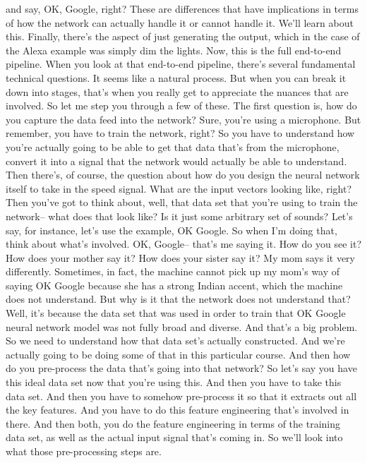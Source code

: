 and say, OK, Google, right?
These are differences that have implications in terms of how
the network can actually handle it or cannot handle it.
We'll learn about this.
Finally, there's the aspect of just generating
the output, which in the case of the Alexa example
was simply dim the lights.
Now, this is the full end-to-end pipeline.
When you look at that end-to-end pipeline,
there's several fundamental technical questions.
It seems like a natural process.
But when you can break it down into stages,
that's when you really get to appreciate the nuances that are involved.
So let me step you through a few of these.
The first question is, how do you capture the data feed into the network?
Sure, you're using a microphone.
But remember, you have to train the network, right?
So you have to understand how you're actually
going to be able to get that data that's from the microphone,
convert it into a signal that the network would actually
be able to understand.
Then there's, of course, the question about how
do you design the neural network itself to take in the speed signal.
What are the input vectors looking like, right?
Then you've got to think about, well, that data
set that you're using to train the network--
what does that look like?
Is it just some arbitrary set of sounds?
Let's say, for instance, let's use the example, OK Google.
So when I'm doing that, think about what's involved.
OK, Google-- that's me saying it.
How do you see it?
How does your mother say it?
How does your sister say it?
My mom says it very differently.
Sometimes, in fact, the machine cannot pick up my mom's way of saying OK
Google because she has a strong Indian accent,
which the machine does not understand.
But why is it that the network does not understand that?
Well, it's because the data set that was used
in order to train that OK Google neural network model was not
fully broad and diverse.
And that's a big problem.
So we need to understand how that data set's actually constructed.
And we're actually going to be doing some of that in this particular course.
And then how do you pre-process the data that's going into that network?
So let's say you have this ideal data set now that you're using this.
And then you have to take this data set.
And then you have to somehow pre-process it
so that it extracts out all the key features.
And you have to do this feature engineering that's involved in there.
And then both, you do the feature engineering
in terms of the training data set, as well as the actual input
signal that's coming in.
So we'll look into what those pre-processing steps are.
